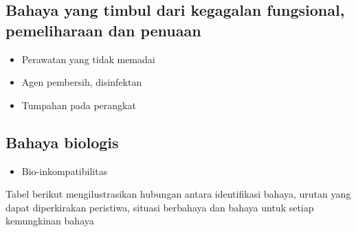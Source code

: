 \documentclass[11pt,a4paper,twoside,onecolumn]{book}
\begin{document}
			\subsection{Bahaya yang timbul dari kegagalan fungsional, pemeliharaan dan penuaan}
			\begin{itemize}
				\item Perawatan yang tidak memadai
				\item Agen pembersih, disinfektan
				\item Tumpahan pada perangkat
			\end{itemize}
			
			\subsection{Bahaya biologis}
			\begin{itemize}
				\item Bio-inkompatibilitas
			\end{itemize}
			
		Tabel berikut mengilustrasikan hubungan antara identifikasi bahaya, urutan yang dapat diperkirakan peristiwa, situasi berbahaya dan bahaya untuk setiap kemungkinan bahaya 
		
\end{document}
